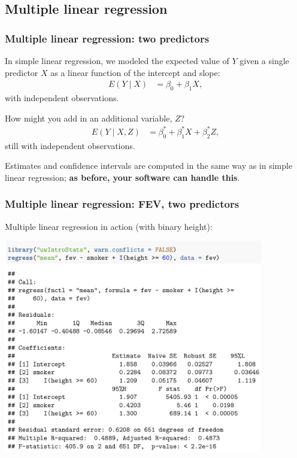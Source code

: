 \documentclass[12pt, 
hyperref={colorlinks=true, linkcolor=blue, urlcolor=cyan}]{beamer}
\begin{document}
\subsection{Multiple linear regression}
\begin{frame}
\frametitle{Multiple linear regression: two predictors}
In simple linear regression, we modeled the expected value of $Y$ given a single predictor $X$ as a linear function of the intercept and slope:
\begin{align*}
E(Y \mid X) &= \beta_0 + \beta_1 X,
\end{align*}
with independent observations.

How might you add in an additional variable, $Z$? \pause
\begin{align*}
E(Y \mid X, Z) &= \beta_0^* + \beta_1^* X + \beta_2^* Z,
\end{align*}
still with independent observations.

Estimates and confidence intervals are computed in the same way as in simple linear regression; \textbf{as before, your software can handle this}.
\end{frame}

\begin{frame}
\frametitle{Multiple linear regression: FEV, two predictors}
Multiple linear regression in action (with binary height): \vspace{-0.45cm}
\begin{center}
\includegraphics[width=0.85\textwidth]{plots/fev_vs_smoke_adjust_binary_height.png}
\end{center}
\end{frame}
\end{document}
